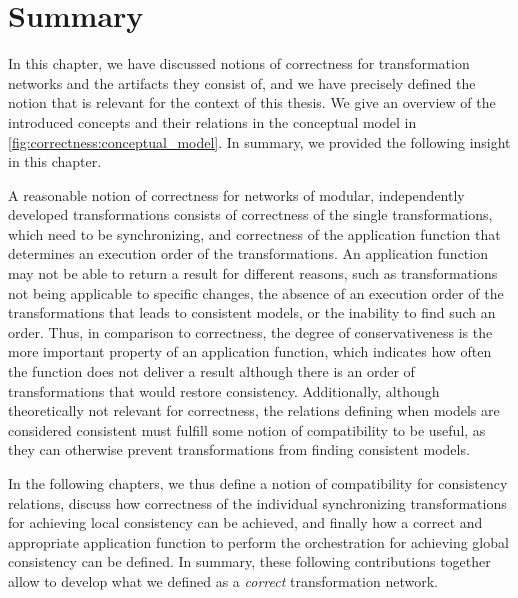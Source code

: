 \section{Summary}
\label{chap:correctness:summary}

In this chapter, we have discussed notions of correctness for transformation networks and the artifacts they consist of, and we have precisely defined the notion that is relevant for the context of this thesis.
We give an overview of the introduced concepts and their relations in the conceptual model in \autoref{fig:correctness:conceptual_model}.
In summary, we provided the following insight in this chapter.

\begin{insight}
    A reasonable notion of correctness for networks of modular, independently developed transformations consists of correctness of the single transformations, which need to be synchronizing, and correctness of the application function that determines an execution order of the transformations.
    An application function may not be able to return a result for different reasons, such as transformations not being applicable to specific changes, the absence of an execution order of the transformations that leads to consistent models, or the inability to find such an order.
    Thus, in comparison to correctness, the degree of conservativeness is the more important property of an application function, which indicates how often the function does not deliver a result although there is an order of transformations that would restore consistency.
    Additionally, although theoretically not relevant for correctness, the relations defining when models are considered consistent must fulfill some notion of compatibility to be useful, as they can otherwise prevent transformations from finding consistent models.
\end{insight}

In the following chapters, we thus define a notion of compatibility for consistency relations, discuss how correctness of the individual synchronizing transformations for achieving local consistency can be achieved, and finally how a correct and appropriate application function to perform the orchestration for achieving global consistency can be defined.
In summary, these following contributions together allow to develop what we defined as a \emph{correct} transformation network.


